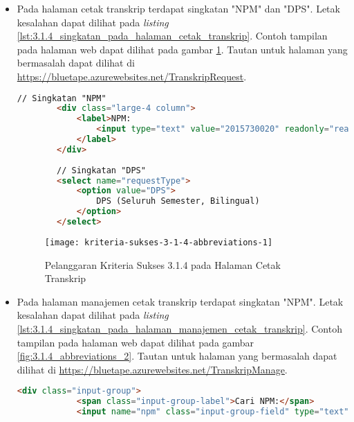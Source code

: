 \begin{itemize}
    \item Pada halaman cetak transkrip terdapat singkatan "NPM" dan "DPS". Letak kesalahan dapat dilihat pada \textit{listing} \ref{lst:3.1.4_singkatan_pada_halaman_cetak_transkrip}. Contoh tampilan pada halaman web dapat dilihat pada gambar \ref{fig:3.1.4_abbreviations_1}. Tautan untuk halaman yang bermasalah dapat dilihat di \url{https://bluetape.azurewebsites.net/TranskripRequest}.
    \begin{lstlisting}[frame=single, label={lst:3.1.4_singkatan_pada_halaman_cetak_transkrip}, language=HTML, caption=Pelanggaran Kriteria Sukses 3.1.4 pada Halaman Cetak Transkrip]
        // Singkatan "NPM"
        <div class="large-4 column">
            <label>NPM:
                <input type="text" value="2015730020" readonly="readonly"/>
            </label>
        </div>
        
        // Singkatan "DPS"
        <select name="requestType">
            <option value="DPS">
                DPS (Seluruh Semester, Bilingual)
            </option>
        </select>
    \end{lstlisting}

    \begin{figure}[H]
        \centering  
        \texttt{[image: kriteria-sukses-3-1-4-abbreviations-1]}  
        \caption[Pelanggaran Kriteria Sukses 3.1.4 pada Halaman Cetak Transkrip]{Pelanggaran Kriteria Sukses 3.1.4 pada Halaman Cetak Transkrip}
        \label{fig:3.1.4_abbreviations_1}  
    \end{figure}

    \item Pada halaman manajemen cetak transkrip terdapat singkatan "NPM". Letak kesalahan dapat dilihat pada \textit{listing} \ref{lst:3.1.4_singkatan_pada_halaman_manajemen_cetak_transkrip}. Contoh tampilan pada halaman web dapat dilihat pada gambar \ref{fig:3.1.4_abbreviations_2}. Tautan untuk halaman yang bermasalah dapat dilihat di \url{https://bluetape.azurewebsites.net/TranskripManage}.
    \begin{lstlisting}[frame=single, label={lst:3.1.4_singkatan_pada_halaman_manajemen_cetak_transkrip}, language=HTML, caption=Pelanggaran Kriteria Sukses 3.1.4 pada Halaman Manajemen Cetak Transkrip]
        <div class="input-group">
            <span class="input-group-label">Cari NPM:</span>
            <input name="npm" class="input-group-field" type="text" placeholder="2013730013" maxlength="10" minlength="10"/>
    \end{lstlisting}


\end{itemize}
